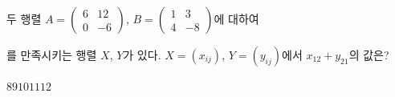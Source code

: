 \hspace*{2mm}\begin{minipage}[t]{\dimexpr\linewidth-2mm\relax}\vspace{0pt}
두 행렬 $A=\begin{pmatrix} 6 & 12 \\ 0 & -6 \end{pmatrix}$, $B=\begin{pmatrix} 1 & 3 \\ 4 & -8 \end{pmatrix}$에 대하여 \par\smallskip{}\par\smallskip\noindent 를 만족시키는 행렬 $X$, $Y$가 있다. $X=(x_{ij})$, $Y=(y_{ij})$에서 $x_{12}+y_{21}$의 값은?
\begin{choices32}{$8$}{$9$}{$10$}{$11$}{$12$}\end{choices32}\end{minipage}
